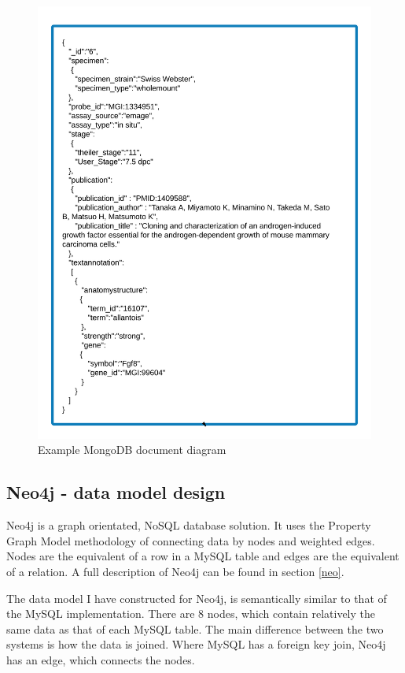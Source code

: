 \newpage
\begin{figure}[H]\begin{center}\includegraphics[width=1\linewidth]{images/mongo_modeldesign}\caption{Example MongoDB document diagram}\label{fig:mongo}\end{center}\end{figure}

\newpage
\subsection{Neo4j - data model design}\label{neomodel}
Neo4j is a graph orientated, NoSQL database solution. It uses the Property Graph Model methodology of connecting data by nodes and weighted edges. Nodes are the equivalent of a row in a MySQL table and edges are the equivalent of a relation. A full description of Neo4j can be found in section \ref{neo}.

The data model I have constructed for Neo4j, is semantically similar to that of the MySQL implementation. There are 8 nodes, which contain relatively the same data as that of each MySQL table. The main difference between the two systems is how the data is joined. Where MySQL has a foreign key join, Neo4j has an edge, which connects the nodes.

